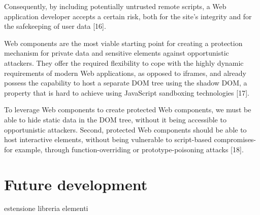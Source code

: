 \documentclass{sig-alternate}
\begin{document}
Consequently, by including potentially untrusted remote scripts, a Web application developer accepts a certain risk, both for the site's integrity and for the safekeeping of user data [16].

Web components are the most viable starting point for creating a protection mechanism for private data and sensitive elements against opportunistic attackers. They offer the required flexibility to cope with the highly dynamic requirements of modern Web applications, as opposed to iframes, and already possess the capability to host a separate DOM tree using the shadow DOM, a property that is hard to achieve using JavaScript sandboxing technologies [17].

To leverage Web components to create protected Web components, we must be able to hide static data in the DOM tree, without it being accessible to opportunistic attackers. Second, protected Web components should be able to host interactive elements, without being vulnerable to script-based compromises-for example, through function-overriding or prototype-poisoning attacks [18].


\section{Future development}

estensione libreria elementi




%

%
%
\end{document}
